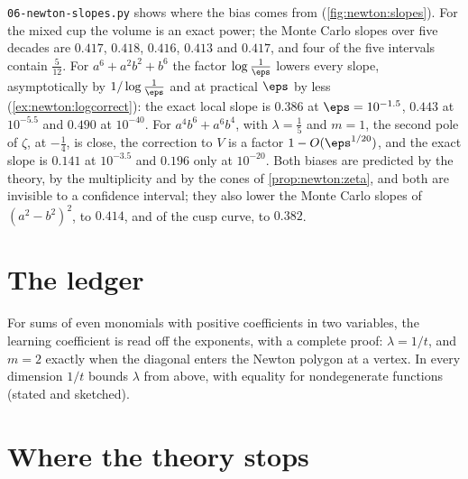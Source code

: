 \begin{refsection}
\texttt{06-newton-slopes.py} shows where the bias comes from (\cref{fig:newton:slopes}). For the mixed cup the volume is an exact power; the Monte Carlo slopes over five decades are $0.417$, $0.418$, $0.416$, $0.413$ and $0.417$, and four of the five intervals contain $\frac5{12}$. For $a^6+a^2b^2+b^6$ the factor $\log\frac1\eps$ lowers every slope, asymptotically by $1/\log\frac1\eps$ and at practical $\eps$ by less (\cref{ex:newton:logcorrect}): the exact local slope is $0.386$ at $\eps=10^{-1.5}$, $0.443$ at $10^{-5.5}$ and $0.490$ at $10^{-40}$. For $a^4b^6+a^6b^4$, with $\lambda=\frac15$ and $m=1$, the second pole of $\zeta$, at $-\frac14$, is close, the correction to $V$ is a factor $1-O(\eps^{1/20})$, and the exact slope is $0.141$ at $10^{-3.5}$ and $0.196$ only at $10^{-20}$. Both biases are predicted by the theory, by the multiplicity and by the cones of \cref{prop:newton:zeta}, and both are invisible to a confidence interval; they also lower the Monte Carlo slopes of $(a^2-b^2)^2$, to $0.414$, and of the cusp curve, to $0.382$.

\section{The ledger}\label{sec:newton:ledger}

For sums of even monomials with positive coefficients in two variables, the learning coefficient is read off the exponents, with a complete proof: $\lambda=1/t$, and $m=2$ exactly when the diagonal enters the Newton polygon at a vertex. In every dimension $1/t$ bounds $\lambda$ from above, with equality for nondegenerate functions (stated and sketched).


\section{Where the theory stops}\label{sec:newton:stops}


\end{refsection}
